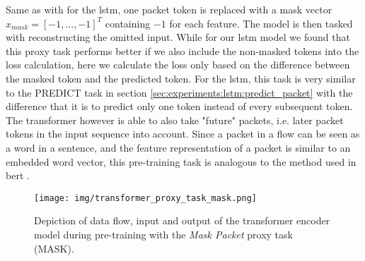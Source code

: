 Same as with for the \gls{lstm}, one packet token is replaced with a mask vector $x_{mask} = [-1, ..., -1]^T$ containing $-1$ for each feature. The model is then tasked with reconstructing the omitted input. While for our \gls{lstm} model we found that this proxy task performs better if we also include the non-masked tokens into the loss calculation, here we calculate the loss only based on the difference between the masked token and the predicted token. For the \gls{lstm}, this task is very similar to the PREDICT task in section \ref{sec:experiments:lstm:predict_packet} with the difference that it is to predict only one token instead of every subsequent token. The transformer however is able to also take "future" packets, i.e. later packet tokens in the input sequence into account.
Since a packet in a flow can be seen as a word in a sentence, and the feature representation of a packet is similar to an embedded word vector, this pre-training task is analogous to the method used in \gls{bert} \cite{bert}. 

\begin{figure}[]
	\centering
	\texttt{[image: img/transformer\_proxy\_task\_mask.png]}
	\caption{Depiction of data flow, input and output of the transformer encoder model during pre-training with the \textit{Mask Packet} proxy task (MASK). }
	\label{fig:experiments:transformer:mask}
\end{figure}

\newpage
